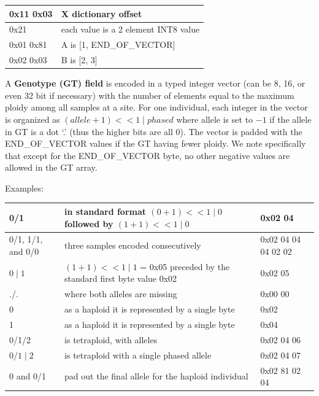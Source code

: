 \documentclass[8pt]{article}
\begin{document}
\vspace{0.3cm}
\begin{tabular}{|p{2cm} | l |} \hline
0x11 0x03 & X dictionary offset \\ \hline
0x21 & each value is a 2 element INT8 value \\ \hline
0x01 0x81 & A is [1, END\_OF\_VECTOR] \\ \hline
0x02 0x03 & B is [2, 3] \\ \hline
\end{tabular}
\vspace{0.3cm}


\vspace{0.3cm}
A \textbf{Genotype (GT) field} is encoded in a typed integer vector (can be 8, 16, or even 32 bit if necessary) with the number of elements equal to the maximum ploidy among all samples at a site.
For one individual, each integer in the vector is organized as $(allele+1) << 1 \mid phased$ where allele is set to $-1$ if the allele in GT is a dot `.' (thus the higher bits are all 0).
The vector is padded with the END\_OF\_VECTOR values if the GT having fewer ploidy.
We note specifically that except for the END\_OF\_VECTOR byte, no other negative values are allowed in the GT array.

Examples:

\vspace{0.3cm}
\small
\begin{tabular}{|p{2.5cm} | p{10cm} | p{3cm}|} \hline
0/1 & in standard format $(0 + 1) << 1 \mid 0$ followed by $(1 + 1) << 1 \mid 0$ & 0x02 04 \\ \hline
0/1, 1/1, and 0/0 & three samples encoded consecutively & 0x02 04 04 04 02 02 \\ \hline
$0\mid1$ & $(1 + 1) << 1 \mid 1$ = 0x05 preceded by the standard first byte value 0x02 & 0x02 05 \\ \hline
./. & where both alleles are missing & 0x00 00 \\ \hline
0 & as a haploid it is represented by a single byte & 0x02 \\ \hline
1 & as a haploid it is represented by a single byte & 0x04 \\ \hline
0/1/2 & is tetraploid, with alleles & 0x02 04 06 \\ \hline
$0/1\mid2$ & is tetraploid with a single phased allele & 0x02 04 07 \\ \hline
0 and 0/1 & pad out the final allele for the haploid individual & 0x02 81 02 04\\ \hline
\end{tabular}
\normalsize
\end{document}
